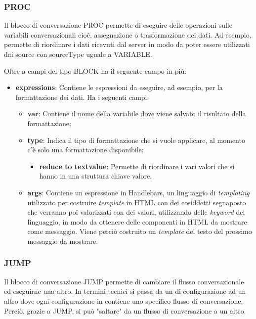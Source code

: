 \subsubsection{PROC}
Il blocco di conversazione PROC permette di eseguire delle operazioni sulle variabili conversazionali cioè, assegnazione o trasformazione dei dati. Ad esempio, permette di riordinare i dati ricevuti dal server in modo da poter essere utilizzati dai source con sourceType uguale a VARIABLE.


Oltre a campi del tipo BLOCK ha il seguente campo in più:

\begin{itemize}
	\item \textbf{expressions}: Contiene le espressioni da eseguire, ad esempio, per la formattazione dei dati.
	Ha i seguenti campi:
	\begin{itemize}
		\item \textbf{var}: Contiene il nome della variabile dove viene salvato il risultato della formattazione;
		\item \textbf{type}: Indica il tipo di formattazione che si vuole applicare, al momento c'è solo una formattazione disponibile:
		\begin{itemize}
			\item \textbf{reduce to textvalue}: Permette di riordinare i vari valori che si hanno in una struttura chiave valore.
		\end{itemize}
		\item \textbf{args}: Contiene un espressione in Handlebars, un linguaggio di \emph{templating} utilizzato per costruire \emph{template} in \gls{HTML} con dei cosiddetti segnaposto che verranno poi valorizzati con dei valori, utilizzando delle \emph{keyword} del linguaggio, in modo da ottenere delle componenti in \gls{HTML} da mostrare come messaggio. Viene perciò costruito un \emph{template} del testo del prossimo messaggio da mostrare.
	\end{itemize}
\end{itemize}

\subsubsection{JUMP}

Il blocco di conversazione JUMP permette di cambiare il flusso conversazionale ed eseguirne una altro. In termini tecnici si passa da un  di configurazione ad un altro dove ogni configurazione in  contiene uno specifico flusso di conversazione. Perciò, grazie a JUMP, si può "saltare" da un flusso di conversazione a un altro. \\

